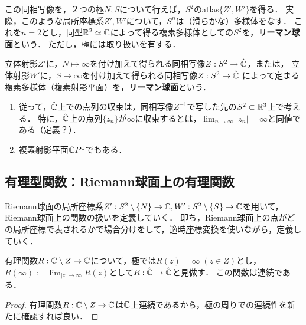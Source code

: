 \documentclass[uplatex, dvipdfmx]{jsreport}
\begin{document}
この同相写像を，２つの極$N,S$について行えば，$S^2$のatlas$\{Z',W'\}$を得る．
実際，このような局所座標系$Z',W'$について，$S^n$は（滑らかな）多様体をなす．
これを$n=2$とし，同型$\mathbb{R}^2\simeq\mathbb{C}$によって得る複素多様体としての$S^2$を，\textbf{リーマン球面}という．
ただし，極には取り扱いを有する．

\begin{definition}
    立体射影$Z'$に，$N\mapsto\infty$を付け加えて得られる同相写像$Z:S^2\to\hat{\mathbb{C}}$，または，
    立体射影$W'$に，$S\mapsto\infty$を付け加えて得られる同相写像$Z:S^2\to\hat{\mathbb{C}}$
    によって定まる複素多様体（複素射影平面）を，\textbf{リーマン球面}という．
\end{definition}
\begin{remark}\mbox{}
    \begin{enumerate}
        \item 従って，$\hat{\mathbb{C}}$上での点列の収束は，同相写像$Z^{-1}$で写した先の$S^2\subset\mathbb{R}^3$上で考える．
        特に，$\hat{\mathbb{C}}$上の点列$\{z_n\}$が$\infty$に収束するとは，$\lim_{n\to\infty}|z_n|=\infty$と同値である（定義？）．
        \item 複素射影平面$\mathbb{C} P^1$でもある．
    \end{enumerate}
\end{remark}

\subsection{有理型関数：Riemann球面上の有理関数}

\begin{screen}
    Riemann球面の局所座標系$Z':S^2\setminus\{N\}\to\mathbb{C},W':S^2\setminus\{S\}\to\mathbb{C}$を用いて，
    Riemann球面上の関数の扱いを定義していく．
    即ち，Riemann球面上の点がどの局所座標で表されるかで場合分けをして，適時座標変換を使いながら，定義していく．
\end{screen}

\begin{proposition}[有理関数の拡張]
    有理関数$R:\mathbb{C}\setminus Z\to\mathbb{C}$について，極では$R(z)=\infty\;(z\in Z)$とし，$R(\infty):=\lim_{|z|\to\infty}R(z)$として$R:\hat{\mathbb{C}}\to\hat{\mathbb{C}}$と見做す．
    この関数は連続である．
\end{proposition}
\begin{proof}
    有理関数$R:\mathbb{C}\setminus Z\to\mathbb{C}$は$\mathbb{C}$上連続であるから，極の周りでの連続性を新たに確認すれば良い．
\end{proof}
\end{document}
